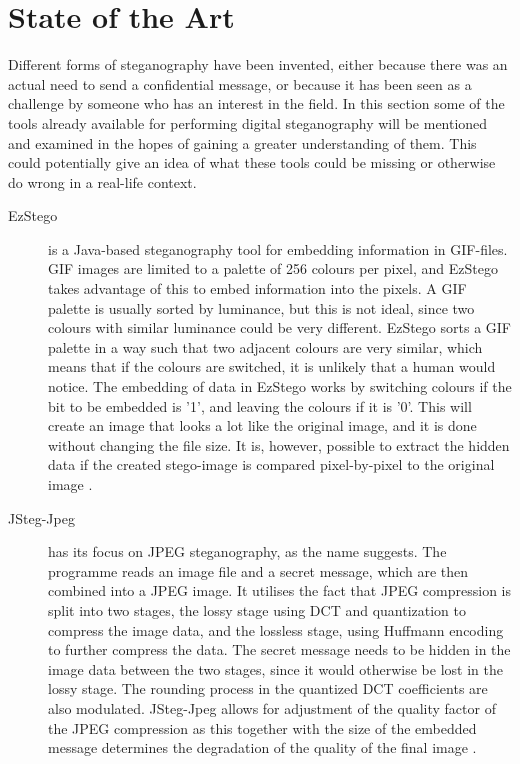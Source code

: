 \section{State of the Art}
\label{sec:SOTA}
Different forms of steganography have been invented, either because there was an actual need to send a confidential message, or because it has been seen as a challenge by someone who has an interest in the field.
In this section some of the tools already available for performing digital steganography will be mentioned and examined in the hopes of gaining a greater understanding of them.
This could potentially give an idea of what these tools could be missing or otherwise do wrong in a real-life context.

\begin{description}
	\item[EzStego] is a Java-based steganography tool for embedding information in GIF-files.
	GIF images are limited to a palette of 256 colours per pixel, and EzStego takes advantage of this to embed information into the pixels.
	A GIF palette is usually sorted by luminance, but this is not ideal, since two colours with similar luminance could be very different.
	EzStego sorts a GIF palette in a way such that two adjacent colours are very similar, which means that if the colours are switched, it is unlikely that a human would notice.
	The embedding of data in EzStego works by switching colours if the bit to be embedded is '1', and leaving the colours if it is '0'.
	This will create an image that looks a lot like the original image, and it is done without changing the file size.
	It is, however, possible to extract the hidden data if the created stego-image is compared pixel-by-pixel to the original image \citep{Westfeld2000}.

	\item[JSteg-Jpeg] has its focus on JPEG steganography, as the name suggests.
	The programme reads an image file and a secret message, which are then combined into a JPEG image.
	It utilises the fact that JPEG compression is split into two stages, the lossy stage using DCT and quantization to compress the image data, and the			lossless stage, using Huffmann encoding to further compress the data.
	The secret message needs to be hidden in the image data between the two stages, since it would otherwise be lost in the lossy stage.
	The rounding process in the quantized DCT coefficients are also modulated.
	JSteg-Jpeg allows for adjustment of the quality factor of the JPEG compression as this together with the size of the embedded message determines the 		degradation of the quality of the final image \citep{ImageProcessingFrankY}.
	

\end{description}
